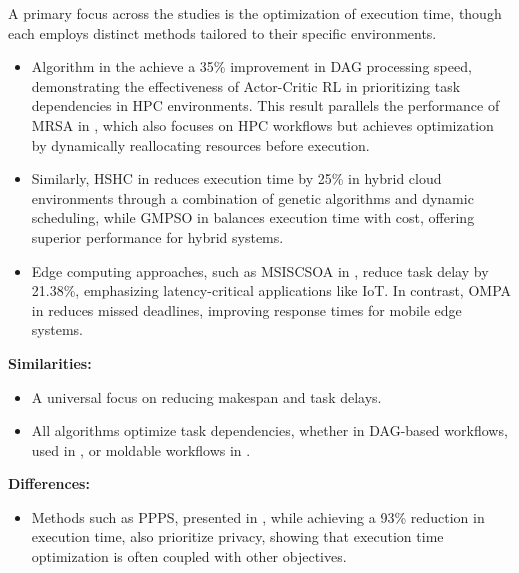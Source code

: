 \documentclass[a4paper, final]{article}
\begin{document}
A primary focus across the studies is the optimization of execution time, though each employs distinct methods tailored to their specific environments.
\begin{itemize}
    \item Algorithm in the \cite{bib:1_acrl} achieve a 35\% improvement in DAG processing speed, demonstrating the effectiveness of 
    Actor-Critic RL in prioritizing task dependencies in HPC environments. This result parallels the performance of MRSA 
    in \cite{bib:8}, which also focuses on HPC workflows but achieves optimization by dynamically reallocating 
    resources before execution.

    \item Similarly, HSHC in \cite{bib:9} reduces execution time by 25\% in hybrid cloud environments through 
    a combination of genetic algorithms and dynamic scheduling, while GMPSO in \cite{bib:10} balances execution
    time with cost, offering superior performance for hybrid systems.

    \item Edge computing approaches, such as MSISCSOA in \cite{bib:3_sandcat}, reduce task delay by 21.38\%, emphasizing 
    latency-critical applications like IoT. In contrast, OMPA in \cite{bib:6_marine} reduces missed deadlines, improving 
    response times for mobile edge systems.
\end{itemize}

\noindent \textbf{Similarities:}
\begin{itemize}
    \item A universal focus on reducing makespan and task delays.
    \item All algorithms optimize task dependencies, whether in DAG-based workflows, used in \cite{bib:1_acrl},
    or moldable workflows in \cite{bib:8}.
\end{itemize}

\noindent \textbf{Differences:}
\begin{itemize}
    \item Methods such as PPPS, presented in \cite{bib:7_ppps}, while achieving a 93\% reduction in execution time, 
    also prioritize privacy, showing that execution time optimization is often coupled with other objectives.
\end{itemize}
\end{document}
